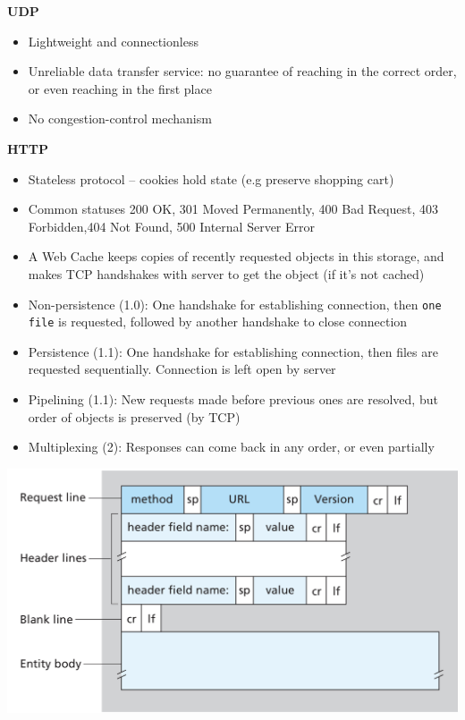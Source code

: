 \documentclass[a4paper]{article} \usepackage[backend=biber, style=numeric, sorting=none]{biblatex}
\begin{document}
\begin{multicols*}{4}
\textbf{UDP}
\begin{itemize}[leftmargin=*]
\item Lightweight and connectionless
\item Unreliable data transfer service: no guarantee of reaching in the correct order, or even reaching in the first place
\item No congestion-control mechanism
\end{itemize}

\textbf{HTTP}
\begin{itemize}[leftmargin=*]
\item Stateless protocol -- cookies hold state (e.g preserve shopping cart)
\item Common statuses 200 OK, 301 Moved Permanently, 400 Bad Request, 403 Forbidden,404 Not Found, 500 Internal Server Error
\item A Web Cache keeps copies of recently requested objects in this storage, and makes TCP handshakes with server to get the object (if it's not cached)
\item Non-persistence (1.0): One handshake for establishing connection, then \texttt{one file} is requested, followed by another handshake to close connection
\item Persistence (1.1): One handshake for establishing connection, then files are requested sequentially. Connection is left open by server
\item Pipelining (1.1): New requests made before previous ones are resolved, but order of objects is preserved (by TCP)
\item Multiplexing (2): Responses can come back in any order, or even partially
\end{itemize}

{\centering \includegraphics[scale=0.20]{http_request}}


\end{multicols*}
\end{document}
